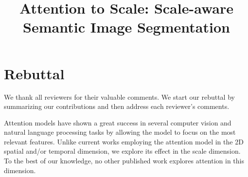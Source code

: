 \documentclass[10pt,twocolumn,letterpaper]{article}
\begin{document}
\title{Attention to Scale: Scale-aware Semantic Image Segmentation}  %

\maketitle
\thispagestyle{empty}



\section{Rebuttal}
\label{sec:overview}
\vspace{-0.17cm}
We thank all reviewers for their valuable comments. We start our rebuttal by summarizing our contributions and then address each reviewer's comments.

Attention models have shown a great success in several computer vision and natural language processing tasks by allowing the model to focus on the most relevant features.
Unlike current works employing the attention model in the 2D spatial and/or temporal dimension, we explore its effect in the scale dimension.
To the best of our knowledge, no other published work explores attention in this dimension. %
\end{document}
